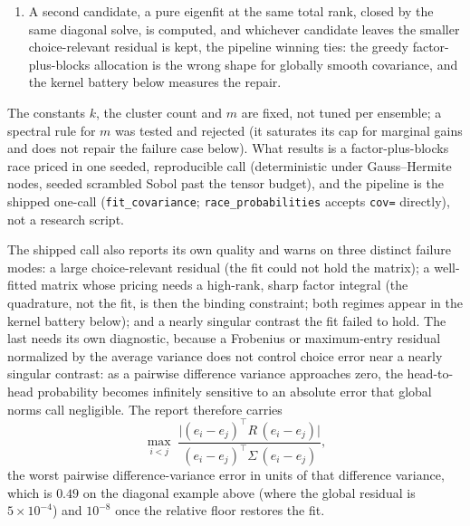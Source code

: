 \documentclass[11pt]{article}
\begin{document}
\begin{enumerate}
singular contrasts, and $\Sigma=\mathrm{diag}(10^{-8},10^{-8},1)$ makes
the failure vivid --- it forced $\mathrm{Var}(X_1-X_2)$ from
$2\times10^{-8}$ up to $6.7\times10^{-4}$, turning a near-certain
head-to-head into a coin flip (choice error $0.48$) while the projected
covariance residual sat one hundred times below the warning threshold. The Gram is exactly
$(1-\tfrac2n)I+\tfrac1{n^2}\mathbf{1}\mathbf{1}^{\top}$, so the
constrained solve is closed form in $O(n)$: substituting $d=\ell+x$
componentwise with $x\ge0$, writing $\ell$ for the vector of
per-runner floors, leaves the same Gram with a shifted right-hand side,
and the KKT conditions make the active set a threshold set, solved by
water-filling. It is the constrained minimizer, not an
unconstrained solve with a floor applied afterwards, which the Gram's
off-diagonal coupling would leave suboptimal. At $n=2$ the Gram is rank
one, only $d_1+d_2$ is identified, and the symmetric representative is
returned.
\item A second candidate, a pure eigenfit at the same total rank, closed by the same
diagonal solve, is computed, and whichever candidate leaves the
smaller choice-relevant residual is kept, the pipeline winning ties:
the greedy factor-plus-blocks allocation is the wrong shape for
globally smooth covariance, and the kernel battery below measures the repair.
\end{enumerate}

The constants $k$, the cluster count and $m$ are
fixed, not tuned per ensemble; a spectral rule for $m$ was tested and
rejected (it saturates its cap for marginal gains and does not repair the
failure case below). What results is a factor-plus-blocks race priced in
one seeded, reproducible call (deterministic under Gauss--Hermite
nodes, seeded scrambled Sobol past the tensor budget), and the pipeline
is the shipped one-call
(\texttt{fit\_covariance}; \texttt{race\_probabilities} accepts
\texttt{cov=} directly), not a research script.

The shipped call also
reports its own quality and warns on three distinct failure modes: a
large choice-relevant residual (the fit could not hold the matrix); a
well-fitted matrix whose pricing needs a high-rank, sharp factor
integral (the quadrature, not the fit, is then the binding constraint;
both regimes appear in the kernel battery below); and a nearly singular
contrast the fit failed to hold. The last needs its own diagnostic,
because a Frobenius or maximum-entry residual normalized by the average
variance does not control choice error near a nearly singular contrast:
as a pairwise difference variance approaches zero, the head-to-head
probability becomes infinitely sensitive to an absolute error that
global norms call negligible. The report therefore carries
\[
\max_{i<j}\;
\frac{\bigl|(e_i-e_j)^{\top}R\,(e_i-e_j)\bigr|}
     {(e_i-e_j)^{\top}\Sigma\,(e_i-e_j)} ,
\]
the worst pairwise difference-variance error in units of that
difference variance, which is $0.49$ on the diagonal example above
(where the global residual is $5\times10^{-4}$) and $10^{-8}$ once the
relative floor restores the fit.
\end{document}
